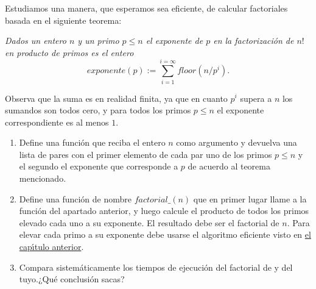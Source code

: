 	
	\begin{ejer}
		
		Estudiamos una manera, que esperamos sea  eficiente,  de calcular factoriales basada en el siguiente teorema:
		
		{\itshape Dados un entero $n$ y un primo $p\le n$ el exponente de $p$ en la factorización de $n!$ en producto de primos es el entero $$exponente(p):=\sum_{i=1}^{i=\infty} floor(n/p^i).$$}
		
		Observa que la suma es en realidad finita, ya que en cuanto $p^i$ supera a $n$ los sumandos son todos cero, y para todos los primos $p\le n$ el exponente correspondiente es al menos $1$.
	
		\begin{enumerate}
		\item Define una función que reciba el entero $n$ como argumento y devuelva una lista de pares con el primer elemento de cada par uno de los primos $p\le n$  y el segundo el exponente que corresponde a $p$ de acuerdo al teorema mencionado. 
		
		\item Define una función de nombre $factorial\_(n)$ que en primer lugar llame a la función del apartado anterior, y luego calcule el producto de todos los primos elevado cada uno a su exponente. El resultado debe ser el factorial de $n$. Para elevar cada primo a su exponente debe usarse el algoritmo eficiente visto en \hyperref[potencias]{el cap\'{\i}tulo anterior}. 
		
		\item  Compara  sistemáticamente los tiempos de ejecución del factorial de {\sage} y del tuyo.¿Qué conclusión sacas?
		
			\end{enumerate}
		
		\end{ejer}
		
